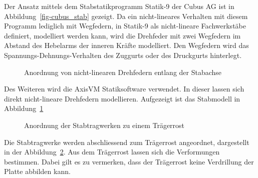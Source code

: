 \documentclass[
  12pt,
  letterpaper,
  egregdoesnotlikesansseriftitles]{scrreprt}
\begin{document}
Der Ansatz mittels dem Stabstatikprogramm Statik-9 der Cubus AG ist in
Abbildung~\ref{fig-cubus_stab} gezeigt. Da ein nicht-lineares Verhalten
mit diesem Programm lediglich mit Wegfedern, in Statik-9 als
nicht-lineare Fachwerkstäbe definiert, modelliert werden kann, wird die
Drehfeder mit zwei Wegfedern im Abstand des Hebelarms der inneren Kräfte
modelliert. Den Wegfedern wird das Spannungs-Dehnungs-Verhalten des
Zuggurts oder des Druckgurts hinterlegt.

\begin{figure}[H]


\caption{\label{fig-axis_stab}Anordnung von nicht-linearen Drehfedern
entlang der Stabachse}

\end{figure}%

Des Weiteren wird die AxisVM Statiksoftware verwendet. In dieser lassen
sich direkt nicht-lineare Drehfedern modellieren. Aufgezeigt ist das
Stabmodell in Abbildung~\ref{fig-axis_stab}

\begin{figure}[H]


\caption{\label{fig-traegerrost}Anordnung der Stabtragwerken zu einem
Trägerrost}

\end{figure}%

Die Stabtragwerke werden abschliessend zum Trägerrost angeordnet,
dargestellt in der Abbildung~\ref{fig-traegerrost}. Aus dem Trägerrost
lassen sich die Verformungen bestimmen. Dabei gilt es zu vermerken, dass
der Trägerrost keine Verdrillung der Platte abbilden kann.

\newpage{}

\end{document}
